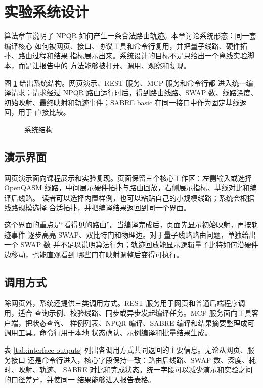 \section{实验系统设计}

算法章节说明了 NPQR 如何产生一条合法路由轨迹。本章讨论系统形态：同一套编译核心
如何被网页、接口、协议工具和命令行复用，并把量子线路、硬件拓扑、路由过程和结果
指标展示出来。系统设计的目标不是只给出一个离线实验脚本，而是让报告中的
方法能够被打开、调用、观察和复现。

图 \ref{fig:system-chain} 给出系统结构。网页演示、REST 服务、MCP 服务和命令行都
进入统一编译请求；请求经过 NPQR 路由运行时后，得到路由线路、SWAP 数、线路深度、
初始映射、最终映射和轨迹事件；SABRE basic 在同一接口中作为固定基线返回，用于
直接比较。

\begin{figure}[H]
  \centering
  
  \caption{系统结构}
  \label{fig:system-chain}
\end{figure}

\subsection{演示界面}

网页演示面向课程展示和实验复现。页面保留三个核心工作区：左侧输入或选择
OpenQASM 线路，中间展示硬件拓扑与路由回放，右侧展示指标、基线对比和编译后线路。
读者可以选择内置样例，也可以粘贴自己的小规模线路；系统会根据线路规模选择
合适拓扑，并把编译结果返回到同一个界面。

这个界面的重点是“看得见的路由”。当编译完成后，页面先显示初始映射，再按轨迹事件
逐步高亮 SWAP、双比特门和物理边。对于量子线路路由问题，单独给出一个 SWAP 数
并不足以说明算法行为；轨迹回放能显示逻辑量子比特如何沿硬件边移动，也能直观看到
哪些门在映射调整后变得可执行。

\subsection{调用方式}

除网页外，系统还提供三类调用方式。REST 服务用于网页和普通后端程序调用，适合
查询示例、校验线路、同步或异步发起编译任务。MCP 服务面向工具客户端，把状态查询、
样例列表、NPQR 编译、SABRE 编译和结果摘要整理成可调用工具。命令行用于本地
状态确认、示例编译和批量结果生成。

表 \ref{tab:interface-outputs} 列出各调用方式共同返回的主要信息。无论从网页、服务接口
还是命令行进入，核心字段保持一致：路由后线路、SWAP 数、深度、耗时、映射、轨迹、
SABRE 对比和完成状态。统一字段可以减少演示和实验之间的口径差异，并使同一
结果能够进入报告表格。

